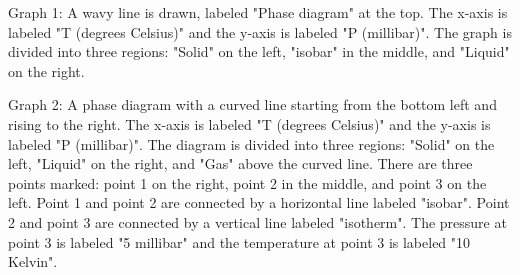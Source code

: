 Graph 1: A wavy line is drawn, labeled "Phase diagram" at the top. The x-axis is labeled "T (degrees Celsius)" and the y-axis is labeled "P (millibar)". The graph is divided into three regions: "Solid" on the left, "isobar" in the middle, and "Liquid" on the right.

Graph 2: A phase diagram with a curved line starting from the bottom left and rising to the right. The x-axis is labeled "T (degrees Celsius)" and the y-axis is labeled "P (millibar)". The diagram is divided into three regions: "Solid" on the left, "Liquid" on the right, and "Gas" above the curved line. There are three points marked: point 1 on the right, point 2 in the middle, and point 3 on the left. Point 1 and point 2 are connected by a horizontal line labeled "isobar". Point 2 and point 3 are connected by a vertical line labeled "isotherm". The pressure at point 3 is labeled "5 millibar" and the temperature at point 3 is labeled "10 Kelvin".